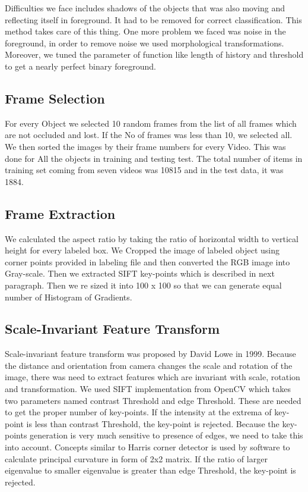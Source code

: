 \documentclass[paper=a4, fontsize=11pt]{scrartcl}
\numberwithin{equation}{section}		%
\numberwithin{figure}{section}			%
\numberwithin{table}{section}				%
\begin{document}
\noindent Difficulties we face includes shadows of the objects that was also moving and reflecting itself in foreground. It had to be removed for correct classification. This method takes care of this thing. One more problem we faced was noise in the foreground, in order to remove noise we used morphological transformations. Moreover, we tuned the parameter of function like length of history and threshold to get a nearly perfect binary foreground.  

\subsection*{\textbf{Frame Selection}}

\noindent For every Object we selected 10 random frames from the list of all frames which are not occluded and lost. If the No of frames was less than 10, we selected all. We then sorted the images by their frame numbers for every Video. This was done for All the objects in training and testing test. The total number of items in training set coming from seven videos was 10815 and in the test data, it was 1884.

\subsection*{ \textbf{Frame Extraction}}

\noindent We calculated the aspect ratio by taking the ratio of horizontal width to vertical height for every labeled box. We Cropped the image of labeled object using corner points provided in labeling file and then converted the RGB image into Gray-scale. Then we extracted SIFT key-points which is described in next paragraph. Then we re sized it into 100 x 100 so that we can generate equal number of Histogram of Gradients.

\subsection*{ \textbf{Scale-Invariant Feature Transform}}

\noindent Scale-invariant feature transform was proposed by David Lowe in 1999. Because the distance and orientation from camera changes the scale and rotation of the image, there was need to extract features which are invariant with scale, rotation and transformation. We used SIFT implementation from OpenCV which takes two parameters named contrast Threshold and edge Threshold. These are needed to get the proper number of key-points. If the intensity at the extrema of key-point is less than contrast Threshold, the key-point is rejected. Because the key-points generation is very much sensitive to presence of edges, we need to take this into account. Concepts similar to Harris corner detector is used by software to calculate principal curvature in form of 2x2 matrix. If the ratio of larger eigenvalue to smaller eigenvalue is greater than edge Threshold, the key-point is rejected.  \\
\end{document}

